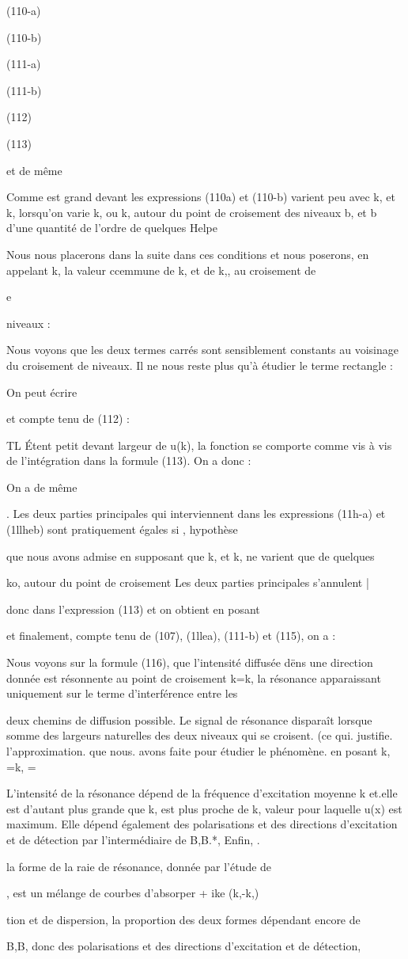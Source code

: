 (110-a)

(110-b)

(111-a)

(111-b)

(112)

(113)



et de même

Comme  est grand devant  les expressions (110a) et
(110-b) varient peu avec k, et k, lorsqu'on varie k, ou k, autour du point
de croisement des niveaux b, et b d'une quantité de l'ordre de quelques
Helpe

Nous nous placerons dans la suite dans ces conditions et nous
poserons, en appelant k, la valeur ccemmune de k, et de k,, au croisement de

e

niveaux :

Nous voyons que les deux termes carrés sont sensiblement constants au voisinage du croisement de niveaux. Il ne nous reste plus qu'à étudier le terme rectangle :

On peut écrire

et compte tenu de (112) :

TL Étent petit devant largeur de u(k), la fonction
se comporte comme
vis à vis de l'intégration dans la formule (113). On a donc :

On a de même

. Les deux parties principales qui interviennent dans les expressions (11h-a) et (1llheb) sont pratiquement égales si , hypothèse

que nous avons admise en supposant que k, et k, ne varient que de quelques

ko, autour du point de croisement Les deux parties principales s'annulent |

donc dans l'expression (113) et on obtient en posant 

et finalement, compte tenu de (107), (1llea), (111-b) et (115), on a :

Nous voyons sur la formule (116), que l'intensité diffusée
dëns une direction donnée est résonnente au point de croisement k=k,
la résonance apparaissant uniquement sur le terme d'interférence entre les

deux chemins de diffusion possible. Le signal de résonance disparaît lorsque
 somme des largeurs naturelles des deux niveaux qui se
croisent. (ce qui. justifie. l'approximation. que nous. avons faite pour étudier
le phénomène. en posant k, =k, = %

L'intensité de la résonance dépend de la fréquence d'excitation
moyenne k et.elle est d'autant plus grande que k, est plus proche de k, valeur
pour laquelle u(x) est maximum. Elle dépend également des polarisations et des
directions d'excitation et de détection par l'intermédiaire de B,B.*, Enfin, .

la forme de la raie de résonance, donnée par l'étude de

, est un mélange de courbes d'absorper + ike (k,-k,)

tion et de dispersion, la proportion des deux formes dépendant encore de

B,B, donc des polarisations et des directions d'excitation et de détection,


